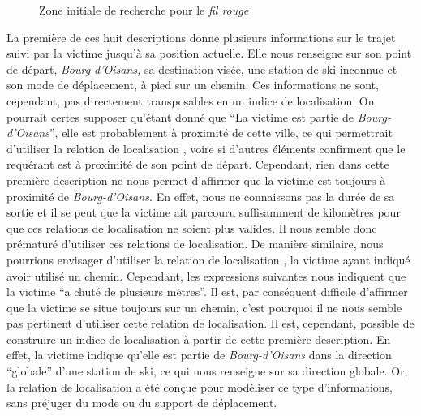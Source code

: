 \begin{figure}
  \centering
  
  \caption{Zone initiale de recherche pour le \emph{fil rouge}}
  \label{fig:zir_fil_rouge}
\end{figure}

La première de ces huit descriptions donne plusieurs informations sur
le trajet suivi par la victime jusqu'à sa position actuelle. Elle nous
renseigne sur son point de départ, \emph{Bourg-d'Oisans,} sa
destination visée, une station de ski inconnue et son mode de
déplacement, à pied sur un chemin. Ces informations ne sont,
cependant, pas directement transposables en un indice de
localisation. On pourrait certes supposer qu'étant donné que
\enquote{La victime est partie de \emph{Bourg-d'Oisans}}, elle est
probablement à proximité de cette ville, ce qui permettrait d'utiliser
la relation de localisation , voire
 si d'autres éléments confirment que le requérant
est à proximité de son point de départ. Cependant, rien dans cette
première description ne nous permet d'affirmer que la victime est
toujours à proximité de \emph{Bourg-d'Oisans.} En effet, nous ne
connaissons pas la durée de sa sortie et il se peut que la victime ait
parcouru suffisamment de kilomètres pour que ces relations de
localisation ne soient plus valides. Il nous semble donc prématuré
d'utiliser ces relations de localisation. De manière similaire, nous
pourrions envisager d'utiliser la relation de localisation
, la victime
ayant indiqué avoir utilisé un chemin. Cependant, les expressions
suivantes nous indiquent que la victime \enquote{a chuté de plusieurs
  mètres}. Il est, par conséquent difficile d'affirmer que la victime
se situe toujours sur un chemin, c'est pourquoi il ne nous semble pas
pertinent d'utiliser cette relation de localisation. Il est,
cependant, possible de construire un indice de localisation à partir
de cette première description. En effet, la victime indique qu'elle
est partie de \emph{Bourg-d'Oisans} dans la direction
\enquote{globale} d'une station de ski, ce qui nous renseigne sur sa
direction globale. Or, la relation de localisation
 a été conçue pour
modéliser ce type d'informations, sans préjuger du mode ou du support
de déplacement.


